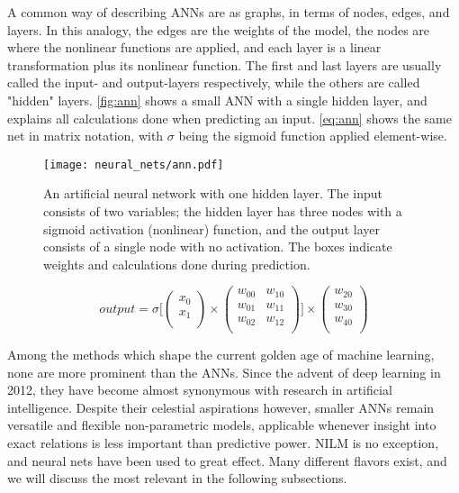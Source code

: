 \documentclass[12pt, american]{article}
\begin{document}
A common way of describing ANNs are as graphs, in terms of nodes, edges, and layers. In this analogy, the edges are the weights of the model, the nodes are where the nonlinear functions are applied, and each layer is a linear transformation plus its nonlinear function. The first and last layers are usually called the input- and output-layers respectively, while the others are called "hidden" layers. \autoref{fig:ann} shows a small ANN with a single hidden layer, and explains all calculations done when predicting an input. \autoref{eq:ann} shows the same net in matrix notation, with $\sigma$ being the sigmoid function applied element-wise.

\begin{figure}[h]
\centering
\caption{An artificial neural network with one hidden layer. The input consists of two variables; the hidden layer has three nodes with a sigmoid activation (nonlinear) function, and the output layer consists of a single node with no activation. The boxes indicate weights and calculations done during prediction.}
\texttt{[image: neural\_nets/ann.pdf]}
\label{fig:ann}
\end{figure}

\begin{equation}
	\label{eq:ann}
	output = 
	\sigma\Bigg[
	\begin{pmatrix}
	x_{0} \\
	x_{1} \\
	\end{pmatrix} \times
	\begin{pmatrix}
	w_{00} & w_{10} \\
	w_{01} & w_{11} \\
	w_{02} & w_{12} \\
	\end{pmatrix}\Bigg]\times
	\begin{pmatrix}
	w_{20}  \\
	w_{30}  \\
	w_{40}  \\
	\end{pmatrix}
\end{equation}


Among the methods which shape the current golden age of machine learning, none are more prominent than the ANNs. Since the advent of deep learning in 2012\cite{Krizhevsky2012}, they have become almost synonymous with research in artificial intelligence. Despite their celestial aspirations however, smaller ANNs remain versatile and flexible  non-parametric models, applicable whenever insight into exact relations is less important than predictive power. NILM is no exception, and neural nets have been used to great effect\cite{Kelly2015c,RevueltaHerrero2018}. Many different flavors exist, and we will discuss the most relevant in the following subsections.
\end{document}
